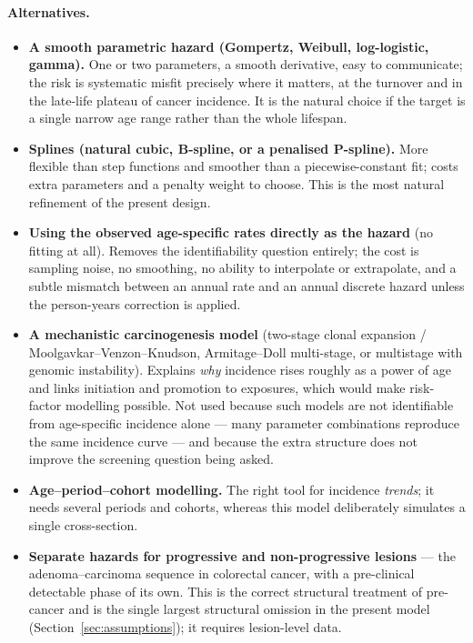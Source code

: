 \documentclass[12pt,a4paper]{article}
\newcommand{\alt}[1]{\paragraph{Alternatives.} #1}
\begin{document}
\alt{\begin{itemize}[nosep]
  \item \textbf{A smooth parametric hazard (Gompertz, Weibull, log-logistic, gamma).} One or two
        parameters, a smooth derivative, easy to communicate; the risk is systematic misfit precisely
        where it matters, at the turnover and in the late-life plateau of cancer incidence. It is the
        natural choice if the target is a single narrow age range rather than the whole lifespan.
  \item \textbf{Splines (natural cubic, B-spline, or a penalised P-spline).} More flexible than step
        functions and smoother than a piecewise-constant fit; costs extra parameters and a penalty
        weight to choose. This is the most natural refinement of the present design.
  \item \textbf{Using the observed age-specific rates directly as the hazard} (no fitting at all).
        Removes the identifiability question entirely; the cost is sampling noise, no smoothing, no
        ability to interpolate or extrapolate, and a subtle mismatch between an annual rate and an annual
        discrete hazard unless the person-years correction is applied.
  \item \textbf{A mechanistic carcinogenesis model} (two-stage clonal expansion / Moolgavkar--Venzon--Knudson,
        Armitage--Doll multi-stage, or multistage with genomic instability). Explains \emph{why} incidence
        rises roughly as a power of age and links initiation and promotion to exposures, which would make
        risk-factor modelling possible. Not used because such models are not identifiable from
        age-specific incidence alone --- many parameter combinations reproduce the same incidence curve
        --- and because the extra structure does not improve the screening question being asked.
  \item \textbf{Age--period--cohort modelling.} The right tool for incidence \emph{trends}; it needs
        several periods and cohorts, whereas this model deliberately simulates a single cross-section.
  \item \textbf{Separate hazards for progressive and non-progressive lesions} --- the adenoma--carcinoma
        sequence in colorectal cancer, with a pre-clinical detectable phase of its own. This is the
        correct structural treatment of pre-cancer and is the single largest structural omission in the
        present model (Section~\ref{sec:assumptions}); it requires lesion-level data.
\end{itemize}}
\end{document}
